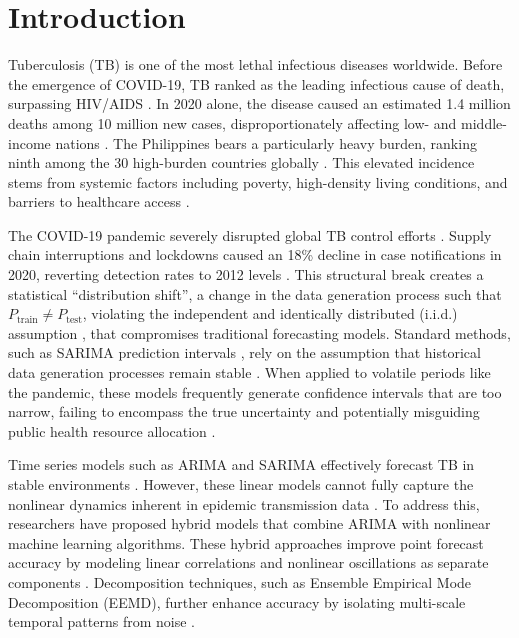 \documentclass[final,3p,times,twocolumn,authoryear]{elsarticle}
\begin{document}
\section{Introduction}
\label{sec:intro}

Tuberculosis (TB) is one of the most lethal infectious diseases worldwide. Before the emergence of COVID-19, TB ranked as the leading infectious cause of death, surpassing HIV/AIDS \citep{marks2019community}. In 2020 alone, the disease caused an estimated 1.4 million deaths among 10 million new cases, disproportionately affecting low- and middle-income nations \citep{corbett2010comparison}. The Philippines bears a particularly heavy burden, ranking ninth among the 30 high-burden countries globally \citep{lonnroth2015towards}. This elevated incidence stems from systemic factors including poverty, high-density living conditions, and barriers to healthcare access \citep{hershkovitz2008detection, wirth2008origin}.

The COVID-19 pandemic severely disrupted global TB control efforts \citep{mcquaid2021potential, mirzayev2021world, alene2020impact}. Supply chain interruptions and lockdowns caused an 18\% decline in case notifications in 2020, reverting detection rates to 2012 levels \citep{mcquaid2021potential}. This structural break creates a statistical ``distribution shift'', a change in the data generation process such that $P_{\text{train}} \neq P_{\text{test}}$, violating the independent and identically distributed (i.i.d.) assumption \citep{quinonero2009dataset}, that compromises traditional forecasting models. Standard methods, such as SARIMA prediction intervals \citep{box2015time}, rely on the assumption that historical data generation processes remain stable \citep{lange2020perspective}. When applied to volatile periods like the pandemic, these models frequently generate confidence intervals that are too narrow, failing to encompass the true uncertainty and potentially misguiding public health resource allocation \citep{nixon2022evaluation}.

Time series models such as ARIMA and SARIMA effectively forecast TB in stable environments \citep{siamba2023application, azeez2016seasonality}. However, these linear models cannot fully capture the nonlinear dynamics inherent in epidemic transmission data \citep{greenhalgh2021generalized}. To address this, researchers have proposed hybrid models that combine ARIMA with nonlinear machine learning algorithms. These hybrid approaches improve point forecast accuracy by modeling linear correlations and nonlinear oscillations as separate components \citep{siamba2023application, azeez2016seasonality, zhang2003time}. Decomposition techniques, such as Ensemble Empirical Mode Decomposition (EEMD), further enhance accuracy by isolating multi-scale temporal patterns from noise \citep{li2021forecasting, takele2020stochastic, bhadauria2023studying, huang1998empirical}.
\end{document}
